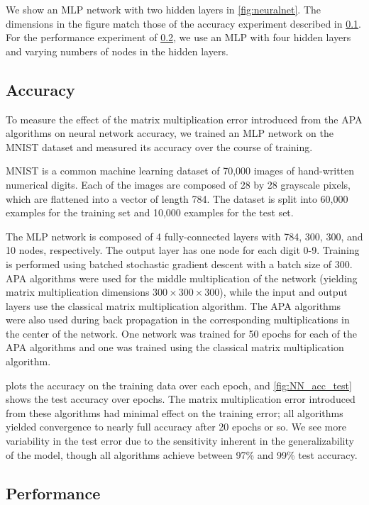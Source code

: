 \documentclass[conference]{IEEEtran}
\begin{document}
We show an MLP network with two hidden layers in \cref{fig:neuralnet}.
The dimensions in the figure match those of the accuracy experiment described in \cref{sec:NNacc}.
For the performance experiment of \cref{sec:NNperf}, we use an MLP with four hidden layers and varying numbers of nodes in the hidden layers.

\subsection{Accuracy}
\label{sec:NNacc}

To measure the effect of the matrix multiplication error introduced from the APA algorithms on neural network accuracy, we trained an MLP network on the MNIST dataset \cite{LBBH98} and measured its accuracy over the course of training. 

MNIST is a common machine learning dataset of 70,000 images of hand-written numerical digits. 
Each of the images are composed of 28 by 28 grayscale pixels, which are flattened into a vector of length 784.
The dataset is split into 60,000 examples for the training set and 10,000 examples for the test set. 

The MLP network is composed of 4 fully-connected layers with 784, 300, 300, and 10 nodes, respectively.  
The output layer has one node for each digit 0-9. 
Training is performed using batched stochastic gradient descent with a batch size of 300.
APA algorithms were used for the middle multiplication of the network (yielding matrix multiplication dimensions $300\times 300\times300$), while the input and output layers use the classical matrix multiplication algorithm. The APA algorithms were also used during back propagation in the corresponding multiplications in the center of the network.
One network was trained for 50 epochs for each of the APA algorithms and one was trained using the classical matrix multiplication algorithm.

 plots the accuracy on the training data over each epoch, and \cref{fig:NN_acc_test} shows the test accuracy over epochs. 
The matrix multiplication error introduced from these algorithms had minimal effect on the training error; all algorithms yielded convergence to nearly full accuracy after 20 epochs or so.
We see more variability in the test error due to the sensitivity inherent in the generalizability of the model, though all algorithms achieve between 97\% and 99\% test accuracy.

\subsection{Performance}
\label{sec:NNperf}
\end{document}
